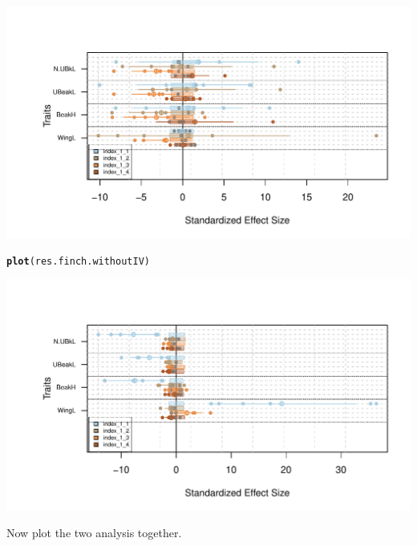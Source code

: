 \documentclass[12pt]{article}\usepackage[]{graphicx}\usepackage[]{color}
\makeatletter
\def\maxwidth{ %
  \ifdim\Gin@nat@width>\linewidth
    \linewidth
  \else
    \Gin@nat@width
  \fi
}
\newcommand{\hlstd}[1]{\textcolor[rgb]{0.345,0.345,0.345}{#1}}%
\newcommand{\hlkwd}[1]{\textcolor[rgb]{0.737,0.353,0.396}{\textbf{#1}}}%
\newenvironment{kframe}{%
 \def\at@end@of@kframe{}%
 \ifinner\ifhmode%
  \def\at@end@of@kframe{\end{minipage}}%
  \begin{minipage}{\columnwidth}%
 \fi\fi%
 \def\FrameCommand##1{\hskip\@totalleftmargin \hskip-\fboxsep
 \colorbox{shadecolor}{##1}\hskip-\fboxsep
     \hskip-\linewidth \hskip-\@totalleftmargin \hskip\columnwidth}%
 \MakeFramed {\advance\hsize-\width
   \@totalleftmargin\z@ \linewidth\hsize
   \@setminipage}}%
 {\par\unskip\endMakeFramed%
 \at@end@of@kframe}
\newenvironment{knitrout}{}{} %
\makeatother
\begin{document}
\begin{knitrout}
{\centering \includegraphics[width=\maxwidth]{figure/unnamed-chunk-461} 

}


\begin{kframe}\begin{alltt}
\hlkwd{plot}\hlstd{(res.finch.withoutIV)}
\end{alltt}
\end{kframe}

{\centering \includegraphics[width=\maxwidth]{figure/unnamed-chunk-462} 

}



\end{knitrout}
Now plot the two analysis together.
\end{document}
